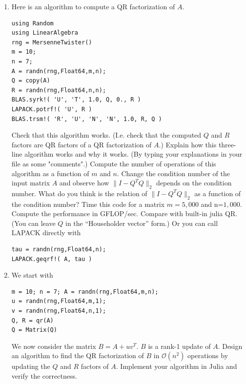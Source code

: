 \documentclass[11pt,letterpaper]{article}
\begin{document}
\begin{enumerate}
\item 
Here is an algorithm to compute a QR factorization of $A$.
\begin{verbatim}
using Random
using LinearAlgebra
rng = MersenneTwister()
m = 10;
n = 7;
A = randn(rng,Float64,m,n);
Q = copy(A)
R = randn(rng,Float64,n,n);
BLAS.syrk!( 'U', 'T', 1.0, Q, 0., R )
LAPACK.potrf!( 'U', R )
BLAS.trsm!( 'R', 'U', 'N', 'N', 1.0, R, Q )
\end{verbatim}
Check that this algorithm works. (I.e. check that the computed $Q$ and $R$ factors
are QR factors of a QR factorization of $A$.)
Explain how this three-line algorithm works and why it works. 
(By typing your explanations in
your file as some "comments".) Compute the number of operations of this
algorithm as a function of $m$ and $n$. Change the condition number of the 
input matrix $A$ and observe how $\|I-Q^TQ\|_2$ depends on the condition number.
What do you think is the relation of $\|I-Q^TQ\|_2$ as a function of the condition number?
Time this code for a matrix $m=5,000$ and n=$1,000$. Compute the performance in GFLOP/sec.
Compare with built-in julia QR. (You can leave $Q$ in the ``Householder vector'' form.)
Or you can call LAPACK directly with
\begin{verbatim}
tau = randn(rng,Float64,n);
LAPACK.geqrf!( A, tau )
\end{verbatim}

\item We start with
\begin{verbatim}
m = 10; n = 7; A = randn(rng,Float64,m,n); 
u = randn(rng,Float64,m,1);
v = randn(rng,Float64,n,1);
Q, R = qr(A)
Q = Matrix(Q)
\end{verbatim}
We now consider the matrix $B=A+uv^T$. $B$
is a rank-1 update of $A$. Design an algorithm to find the QR factorization of $B$ in
$\mathcal{O}(n^2)$ operations by updating the $Q$ and $R$ factors of $A$.
Implement your algorithm in Julia and verify the correctness.

\end{enumerate}
\end{document}
